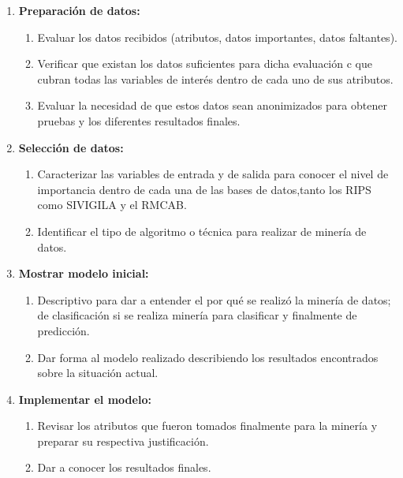 \documentclass[a4paper,openright,12pt]{book}
\theoremstyle{definition}
\theoremstyle{remark}
\begin{document}
\begin{enumerate}
	\item \textbf{Preparación de datos:}
    \begin{enumerate}
		
        \item Evaluar los datos recibidos (atributos, datos importantes, datos faltantes).
    	
        \item Verificar que existan los datos suficientes para dicha evaluación c que cubran todas las variables de interés dentro de cada uno de sus atributos.
        
    	\item Evaluar la necesidad de que estos datos sean anonimizados para obtener pruebas y los diferentes resultados finales.
        
	\end{enumerate}
    
    \item \textbf{Selección de datos:}
    \begin{enumerate}
		\item Caracterizar las variables de entrada y de salida para conocer el nivel de importancia dentro de cada una de las bases de datos,tanto los RIPS como SIVIGILA y el RMCAB.
    	\item Identificar el tipo de algoritmo o técnica para realizar de minería de datos.
	\end{enumerate}
    \item \textbf{Mostrar modelo inicial:}
     \begin{enumerate}
		\item Descriptivo para dar a entender el por qué se realizó la minería de datos; de clasificación si se realiza minería para clasificar y finalmente de predicción.
    	\item Dar forma al modelo realizado describiendo  los resultados encontrados sobre la situación actual.
	\end{enumerate}
    \item \textbf{Implementar el modelo:}
      \begin{enumerate}
		\item Revisar los atributos que fueron tomados finalmente para la minería y preparar su respectiva justificación.
    	\item Dar a conocer los resultados finales.
	\end{enumerate}
\end{enumerate}
\end{document}
